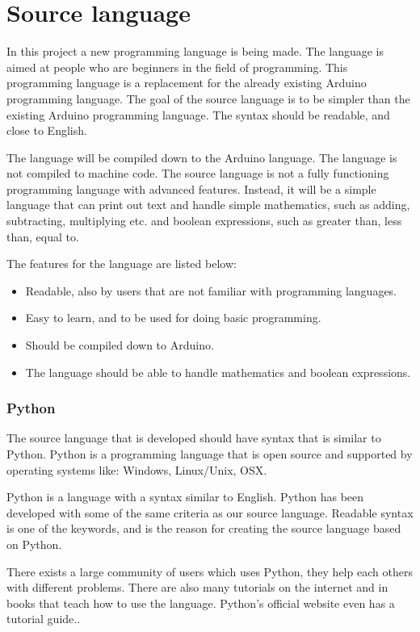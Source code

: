 \chapter{Source language}\label{analysis:source-language}
In this project a new programming language is being made. The language is aimed at people who are beginners in the field of programming. This programming language is a replacement for the already existing Arduino programming language. 
The goal of the source language is to be simpler than the existing Arduino programming language. The syntax should be readable, and close to English.

The language will be compiled down to the Arduino language. The language is not compiled to machine code. The source language is not a fully functioning programming language with advanced features. Instead, it will be a simple language that can print out text and handle simple mathematics, such as adding, subtracting, multiplying etc. and boolean expressions, such as greater than, less than, equal to.

The features for the language are listed below:
\begin{itemize}
	\item Readable, also by users that are not familiar with programming languages.
	\item Easy to learn, and to be used for doing basic programming.
	\item Should be compiled down to Arduino.
	\item The language should be able to handle mathematics and boolean expressions.
\end{itemize}

\subsection{Python}
The source language that is developed should have syntax that is similar to Python. Python is a programming language that is open source and supported by operating systems like: Windows, Linux/Unix, OSX.

Python is a language with a syntax similar to English.
Python has been developed with some of the same criteria as our source language. Readable syntax is one of the keywords, and is the reason for creating the source language based on Python.
 
\cite{python:official:about}
There exists a large community of users which uses Python, they help each others with different problems. There are also many tutorials on the internet and in books that teach how to use the language. Python's official website even has a tutorial guide.\cite{python:official:tutorial}.